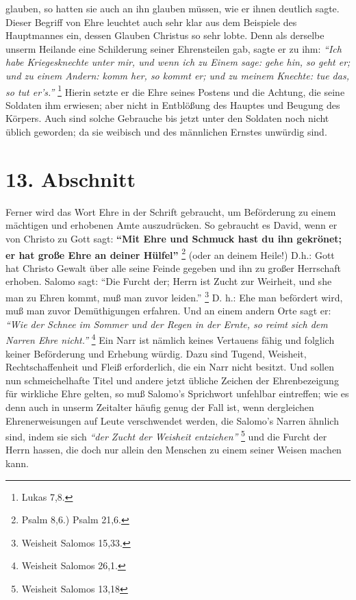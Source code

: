 glauben, so hatten sie auch an ihn glauben müssen, wie er ihnen deutlich sagte.
Dieser Begriff von Ehre leuchtet auch sehr klar aus dem Beispiele des
Hauptmannes ein, dessen Glauben Christus so sehr lobte. Denn als derselbe unserm
Heilande eine Schilderung seiner Ehrensteilen gab, sagte er zu ihm:
\textit{"`Ich habe
Kriegesknechte unter mir, und wenn ich zu Einem sage: gehe hin, so geht er; und
zu einem Andern: komm her, so kommt er; und zu meinem Knechte: tue das, so tut
er’s."'}
\footnote{Lukas 7,8.}
Hierin setzte er die Ehre seines Postens und die
Achtung, die seine Soldaten ihm erwiesen; aber nicht in
Entblößung des Hauptes
und Beugung des Körpers. Auch sind solche Gebrauche bis jetzt unter den Soldaten
noch nicht üblich geworden; da sie weibisch und des männlichen
Ernstes unwürdig
sind.

\section{13. Abschnitt} \label{kap9_ab13}

Ferner wird das Wort Ehre in der Schrift gebraucht, um Beförderung zu einem
mächtigen und erhobenen Amte auszudrücken. So gebraucht es
David, wenn er von
Christo zu Gott sagt:
\textbf{"`Mit Ehre und Schmuck hast du ihn gekrönet; er hat große
Ehre an deiner Hülfel"'}
\footnote{Psalm 8,6.) Psalm 21,6.}
(oder an deinem Heile!) D.h.: Gott hat Christo Gewalt über alle seine Feinde
gegeben und ihn zu großer
Herrschaft erhoben. Salomo  sagt:
"`Die Furcht der; Herrn ist Zucht zur Weirheit,
und she man zu Ehren kommt, muß man zuvor leiden."'
\footnote{Weisheit Salomos 15,33.}
D. h.: Ehe man befördert wird, muß man zuvor Demüthigungen
erfahren. Und an
einem andern Orte sagt er:
\textit{"`Wie der Schnee im Sommer und der Regen in der
Ernte, so reimt sich dem Narren Ehre nicht."'}
\footnote{Weisheit Salomos 26,1.}
Ein Narr ist
nämlich keines Vertauens fähig und folglich keiner Beförderung und Erhebung
würdig. Dazu sind Tugend, Weisheit, Rechtschaffenheit und Fleiß erforderlich,
die ein Narr nicht besitzt. Und sollen nun schmeichelhafte Titel und andere
jetzt übliche Zeichen der Ehrenbezeigung für wirkliche Ehre gelten, so muß
Salomo’s  Sprichwort unfehlbar eintreffen; wie es denn auch in unserm Zeitalter
häufig genug der Fall ist, wenn dergleichen Ehrenerweisungen auf Leute
verschwendet werden, die Salomo’s Narren ähnlich sind, indem sie sich
\textit{"`der Zucht der Weisheit entziehen"'}
\footnote{Weisheit Salomos 13,18}
und die Furcht der
Herrn hassen, die doch nur allein den Menschen zu einem seiner Weisen machen
kann.

